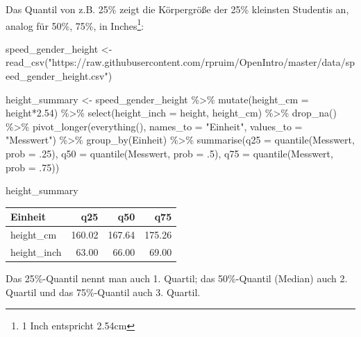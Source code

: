 \documentclass[
  a4paper,
  DIV=11]{scrreprt}
\newenvironment{Shaded}{\begin{snugshade}}{\end{snugshade}}
\newcommand{\AttributeTok}[1]{\textcolor[rgb]{0.40,0.45,0.13}{#1}}
\newcommand{\DecValTok}[1]{\textcolor[rgb]{0.68,0.00,0.00}{#1}}
\newcommand{\FloatTok}[1]{\textcolor[rgb]{0.68,0.00,0.00}{#1}}
\newcommand{\FunctionTok}[1]{\textcolor[rgb]{0.28,0.35,0.67}{#1}}
\newcommand{\NormalTok}[1]{\textcolor[rgb]{0.00,0.23,0.31}{#1}}
\newcommand{\OtherTok}[1]{\textcolor[rgb]{0.00,0.23,0.31}{#1}}
\newcommand{\SpecialCharTok}[1]{\textcolor[rgb]{0.37,0.37,0.37}{#1}}
\newcommand{\StringTok}[1]{\textcolor[rgb]{0.13,0.47,0.30}{#1}}
\theoremstyle{definition}
\theoremstyle{remark}
\begin{document}
Das Quantil von z.B. 25\% zeigt die Körpergröße der 25\% kleinsten
Studentis an, analog für 50\%, 75\%, in Inches\footnote{1 Inch
  entspricht 2.54cm}:

\begin{Shaded}
\begin{Highlighting}[]
\NormalTok{speed\_gender\_height }\OtherTok{\textless{}{-}} \FunctionTok{read\_csv}\NormalTok{(}\StringTok{"https://raw.githubusercontent.com/rpruim/OpenIntro/master/data/speed\_gender\_height.csv"}\NormalTok{)}

\NormalTok{height\_summary }\OtherTok{\textless{}{-}} 
\NormalTok{  speed\_gender\_height }\SpecialCharTok{\%\textgreater{}\%} 
  \FunctionTok{mutate}\NormalTok{(}\AttributeTok{height\_cm =}\NormalTok{ height}\SpecialCharTok{*}\FloatTok{2.54}\NormalTok{) }\SpecialCharTok{\%\textgreater{}\%} 
  \FunctionTok{select}\NormalTok{(}\AttributeTok{height\_inch =}\NormalTok{ height, height\_cm) }\SpecialCharTok{\%\textgreater{}\%} 
  \FunctionTok{drop\_na}\NormalTok{() }\SpecialCharTok{\%\textgreater{}\%} 
  \FunctionTok{pivot\_longer}\NormalTok{(}\FunctionTok{everything}\NormalTok{(), }\AttributeTok{names\_to =} \StringTok{"Einheit"}\NormalTok{, }\AttributeTok{values\_to =} \StringTok{"Messwert"}\NormalTok{) }\SpecialCharTok{\%\textgreater{}\%} 
  \FunctionTok{group\_by}\NormalTok{(Einheit) }\SpecialCharTok{\%\textgreater{}\%} 
  \FunctionTok{summarise}\NormalTok{(}\AttributeTok{q25 =} \FunctionTok{quantile}\NormalTok{(Messwert, }\AttributeTok{prob =}\NormalTok{ .}\DecValTok{25}\NormalTok{),}
            \AttributeTok{q50 =} \FunctionTok{quantile}\NormalTok{(Messwert, }\AttributeTok{prob =}\NormalTok{ .}\DecValTok{5}\NormalTok{),}
            \AttributeTok{q75 =} \FunctionTok{quantile}\NormalTok{(Messwert, }\AttributeTok{prob =}\NormalTok{ .}\DecValTok{75}\NormalTok{))}

\NormalTok{height\_summary}
\end{Highlighting}
\end{Shaded}

\begin{longtable}[]{@{}lrrr@{}}
\toprule()
Einheit & q25 & q50 & q75 \\
\midrule()
\endhead
height\_cm & 160.02 & 167.64 & 175.26 \\
height\_inch & 63.00 & 66.00 & 69.00 \\
\bottomrule()
\end{longtable}

Das 25\%-Quantil nennt man auch 1. Quartil; das 50\%-Quantil (Median)
auch 2. Quartil und das 75\%-Quantil auch 3. Quartil.
\end{document}
